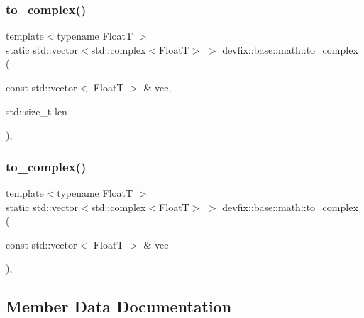 \mbox{\label{structdevfix_1_1base_1_1math_a0178a6ca347209c523138b9bbaddd9cf}} 
\subsubsection{\texorpdfstring{to\+\_\+complex()}{to\_complex()}\hspace{0.1cm}{\footnotesize\ttfamily [3/4]}}
{\footnotesize\ttfamily template$<$typename FloatT $>$ \\
static std\+::vector$<$std\+::complex$<$FloatT$>$ $>$ devfix\+::base\+::math\+::to\+\_\+complex (\begin{DoxyParamCaption}\item[{const std\+::vector$<$ FloatT $>$ \&}]{vec,  }\item[{std\+::size\+\_\+t}]{len }\end{DoxyParamCaption})\hspace{0.3cm}{\ttfamily [inline]}, {\ttfamily [static]}}

\mbox{\label{structdevfix_1_1base_1_1math_adcc63e97e0ff2fed3526451d56a28d24}} 
\subsubsection{\texorpdfstring{to\+\_\+complex()}{to\_complex()}\hspace{0.1cm}{\footnotesize\ttfamily [4/4]}}
{\footnotesize\ttfamily template$<$typename FloatT $>$ \\
static std\+::vector$<$std\+::complex$<$FloatT$>$ $>$ devfix\+::base\+::math\+::to\+\_\+complex (\begin{DoxyParamCaption}\item[{const std\+::vector$<$ FloatT $>$ \&}]{vec }\end{DoxyParamCaption})\hspace{0.3cm}{\ttfamily [inline]}, {\ttfamily [static]}}



\subsection{Member Data Documentation}
\mbox{\label{structdevfix_1_1base_1_1math_a8c1abe5113400c369f55d3e0bd12c25d}} 
